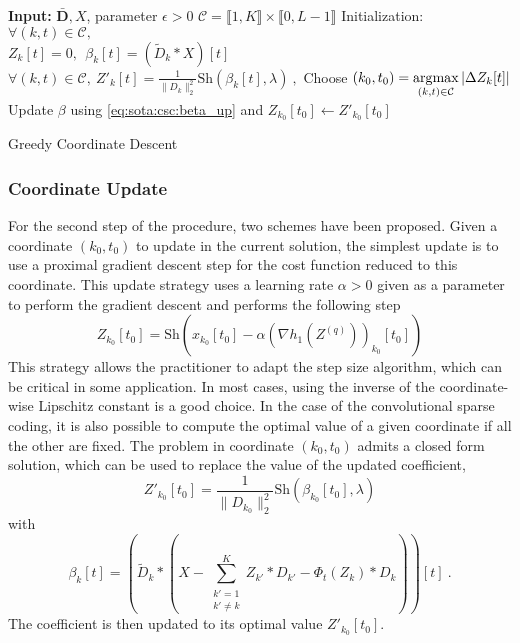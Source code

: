 \documentclass[../thesis.tex]{subfiles}
\begin{document}
\begin{algorithm}[t]
	\begin{algorithmic}[1]

		\STATE \textbf{Input: }$\bar{\pmb D}, X$, parameter $\epsilon >  0$
		\STATE $\mathcal C = \llbracket1, K\rrbracket\times\llbracket0, L-1\rrbracket$
		\STATE Initialization: $\forall (k,t) \in \mathcal C,~~ $  \\
		 $Z_k[t] = 0,~~\beta_k[t] = \left(\widetilde  D_k * X\right)[t]$
		\REPEAT
		\STATE $\forall(k,t) \in \mathcal C,~\displaystyle
				Z'_k[t] = \frac{1}{\|D_k\|_2^2}\text{Sh}(\beta_k[t], \lambda)~,$
		\STATE Choose $\displaystyle(k_0, t_0) = \operatorname*{\arg\!\max}_{(k, t)\in\mathcal C} |\Delta Z_k[t]|$
		\STATE Update $\beta$ using \autoref{eq:sota:csc:beta_up} and $Z_{k_0}[t_0] \leftarrow Z'_{k_0}[t_0]$

	\end{algorithmic}
	\caption{Greedy Coordinate Descent}
	\label{alg:cd}
\end{algorithm}

\subsubsection{Coordinate Update}
\label{ssub:coordinate_update}

	For the second step of the procedure, two schemes have been proposed. Given a coordinate
	$(k_0, t_0)$ to update in the current solution, the simplest update is to use a proximal
	gradient descent step for the cost function reduced to this coordinate. This update
	strategy uses a learning rate $\alpha > 0$ given as a parameter to perform the gradient
	descent and performs the following step
	\begin{equation}
		\label{eq:cd_prox_gd}
		Z_{k_0}[t_0] = \text{Sh}
			\left(x_{k_0}[t_0] - \alpha\left(\nabla h_1(Z^{(q)})\right)_{k_0}[t_0]\right)
	\end{equation}
	This strategy allows the practitioner to adapt the step size algorithm, which can be
	critical in some application. In most cases, using the inverse of the coordinate-wise
	Lipschitz constant is a good choice. In the case of the convolutional sparse coding,
	it is also possible to compute the optimal value of a given coordinate if all the other
	are fixed. The problem in coordinate $(k_0, t_0)$ admits a closed form solution, which
	can be used to replace the value of the updated coefficient,
	\begin{equation}
		\label{eq:cd_greedy}
		Z'_{k_0}[t_0] = \frac{1}{\|D_{k_0}\|_2^2}\text{Sh}(\beta_{k_0}[t_0], \lambda)
	\end{equation}
	with
	\[
		\beta_{k}[t] = \left(\widetilde D_{k}*\left(X- \sum_{\substack{k'=1\\k'\neq k}}^KZ_{k'}*D_{k'}
		- \Phi_{t}\left(Z_{k}\right)*D_{k}\right)\right)[t]~.
	\]
	The coefficient is then updated to its optimal value $Z'_{k_0}[t_0]$.
\end{document}
